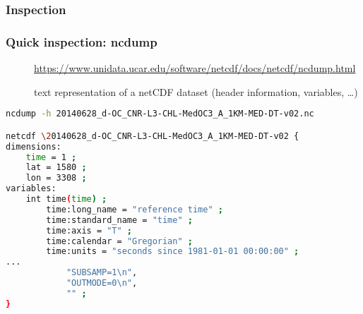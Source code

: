 \subsubsection{Inspection}

\begin{frame}[c, fragile]
\frametitle{Quick inspection: ncdump}

\begin{description}
\item[\homepage] {\scriptsize \url{https://www.unidata.ucar.edu/software/netcdf/docs/netcdf/ncdump.html}}
\item[\tool] text representation of a netCDF dataset (header information, variables, \ldots)
\end{description}

\vfill

\begin{lstlisting}[language=bash,basicstyle=\tiny,title={ncdump applied on a file}]
ncdump -h 20140628_d-OC_CNR-L3-CHL-MedOC3_A_1KM-MED-DT-v02.nc

netcdf \20140628_d-OC_CNR-L3-CHL-MedOC3_A_1KM-MED-DT-v02 {
dimensions:
	time = 1 ;
	lat = 1580 ;
	lon = 3308 ;
variables:
	int time(time) ;
		time:long_name = "reference time" ;
		time:standard_name = "time" ;
		time:axis = "T" ;
		time:calendar = "Gregorian" ;
		time:units = "seconds since 1981-01-01 00:00:00" ;
...
			"SUBSAMP=1\n",
			"OUTMODE=0\n",
			"" ;
}

\end{lstlisting}

\end{frame}

